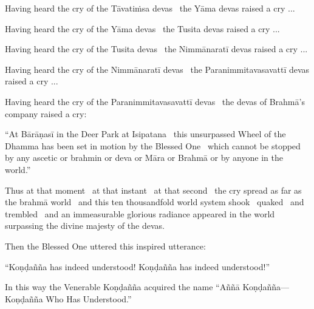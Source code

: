\begin{english-hang}
  Having heard the cry of the Tāvatiṁsa devas \breathmark\ the Yāma devas raised a cry ...
\end{english-hang}

\begin{english-hang}
  Having heard the cry of the Yāma devas \breathmark\ the Tusita devas raised a cry ...
\end{english-hang}

\begin{english-hang}
  Having heard the cry of the Tusita devas \breathmark\ the Nimmānaratī devas raised a cry ...
\end{english-hang}

\begin{english-hang}
  Having heard the cry of the Nimmānaratī devas \breathmark\ the Paranimmitavasavattī devas raised a cry ...
\end{english-hang}

\begin{english-hang}
  Having heard the cry of the Paranimmitavasavattī devas \breathmark\ the devas of Brahmā's company raised a cry:
\end{english-hang}

\begin{english-hang}
  ``At Bārāṇasī in the Deer Park at Isipatana \breathmark\ this unsurpassed Wheel of the Dhamma has been set in motion by the Blessed One \breathmark\ which cannot be stopped by any ascetic or brahmin or deva or Māra or Brahmā or by anyone in the world.''
\end{english-hang}

\begin{english-hang}
  Thus at that moment \breathmark\ at that instant \breathmark\ at that second \breathmark\ the cry spread as far as the brahmā world \breathmark\ and this ten thousandfold world system shook \breathmark\ quaked \breathmark\ and trembled \breathmark\ and an immeasurable glorious radiance appeared in the world surpassing the divine majesty of the devas.
\end{english-hang}

\begin{english-hang}
  Then the Blessed One uttered this inspired utterance:
\end{english-hang}

\begin{english-hang}
  ``Koṇḍañña has indeed understood! Koṇḍañña has indeed understood!''
\end{english-hang}

\begin{english-hang}
  In this way the Venerable Koṇḍañña acquired the name ``Aññā Koṇḍañña—Koṇḍañña Who Has Understood.''
\end{english-hang}

\suttaRef{[SN 56.11]}
